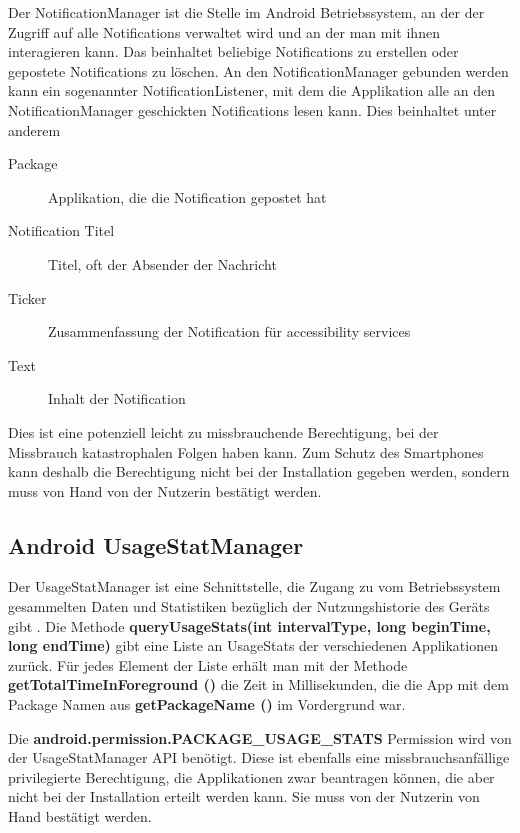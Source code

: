 Der NotificationManager ist die Stelle im Android Betriebssystem, an der der Zugriff auf alle Notifications verwaltet wird und an der man mit ihnen interagieren kann.
Das beinhaltet beliebige Notifications zu erstellen oder gepostete Notifications zu löschen.
An den NotificationManager gebunden werden kann ein sogenannter NotificationListener, mit dem die Applikation alle an den NotificationManager geschickten Notifications lesen kann.
Dies beinhaltet unter anderem

\begin{description}
    \item [Package] Applikation, die die Notification gepostet hat
    \item [Notification Titel] Titel, oft der Absender der Nachricht
    \item [Ticker] Zusammenfassung der Notification für accessibility services
    \item [Text] Inhalt der Notification
\end{description}

Dies ist eine potenziell leicht zu missbrauchende Berechtigung, bei der Missbrauch katastrophalen Folgen haben kann.
Zum Schutz des Smartphones kann deshalb die Berechtigung nicht bei der Installation gegeben werden, sondern muss von Hand von der Nutzerin bestätigt werden. 


\subsection {Android UsageStatManager}

Der UsageStatManager ist eine Schnittstelle, die Zugang zu vom Betriebssystem gesammelten Daten
und Statistiken bezüglich der Nutzungshistorie des Geräts gibt \cite{androidusagestat}.
Die Methode \textbf{queryUsageStats(int intervalType, long beginTime, long endTime)} gibt eine Liste an UsageStats der verschiedenen Applikationen zurück.
Für jedes Element der Liste erhält man mit der Methode \textbf{getTotalTimeInForeground ()} die Zeit in Millisekunden,
die die App mit dem Package Namen aus \textbf{getPackageName ()} im Vordergrund war.
\par
Die \textbf{android.permission.PACKAGE\_USAGE\_STATS} Permission wird von der UsageStatManager API benötigt.
Diese ist ebenfalls eine missbrauchsanfällige privilegierte Berechtigung, die Applikationen zwar beantragen können, die aber nicht bei der Installation erteilt werden kann.
Sie muss von der Nutzerin von Hand bestätigt werden.


